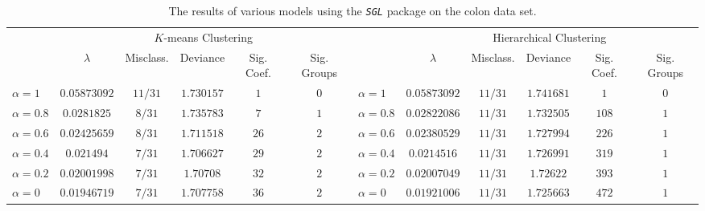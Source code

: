 \documentclass[10pt]{article}
\begin{document}
\begin{landscape}

\begin{table}[ht]
    \centering
    \def\arraystretch{1.5}
    
    \begin{tabularx}{0.925\linewidth}{lccccclccccc} \toprule
         & \multicolumn{5}{c}{$K$-means Clustering} &  &  \multicolumn{5}{c}{Hierarchical Clustering} \\ \cmidrule(r){2-6} \cmidrule(lr){8-12}
         & $\lambda$ & Misclass. & Deviance & Sig. Coef. & Sig. Groups & & $\lambda$ & Misclass. & Deviance & Sig. Coef. & Sig. Groups\\ \midrule
        $\alpha = 1$   & $0.05873092$ & $11/31$ & $1.730157$ & $1$ & $0$ & $\alpha = 1$   & $0.05873092$ & $11/31$ & $1.741681$ & $1$ & $0$ \\ 
        $\alpha = 0.8$ & $0.0281825$ & $8/31$ & $1.735783$ & $7$ & $1$ & $\alpha = 0.8$  & $0.02822086$ & $11/31$ & $1.732505$ & $108$ & $1$ \\ 
        $\alpha = 0.6$ & $0.02425659$ & $8/31$ & $1.711518$ & $26$ & $2$ & $\alpha = 0.6$ & $0.02380529$ & $11/31$ & $1.727994$ & $226$ & $1$ \\ 
        $\alpha = 0.4$ & $0.021494$ & $7/31$ & $1.706627$ & $29$ & $2$ & $\alpha = 0.4$   & $0.0214516$ & $11/31$ & $1.726991$ & $319$ & $1$ \\ 
        $\alpha = 0.2$ & $0.02001998$ & $7/31$ & $1.70708$ & $32$ & $2$ & $\alpha = 0.2$ & $0.02007049$ & $11/31$ & $1.72622$ & $393$ & $1$ \\
        $\alpha = 0$   & $0.01946719$ & $7/31$ & $1.707758$ & $36$ & $2$ & $\alpha = 0$   & $0.01921006$ & $11/31$ & $1.725663$ & $472$ & $1$ \\ \bottomrule
    \end{tabularx}
    \caption{The results of various models using the \emph{\texttt{SGL}} package on the colon data set.}
    \label{SGLcolontab}
    
    \vspace{0.45cm}
    

\end{table}
\end{landscape}
\end{document}
